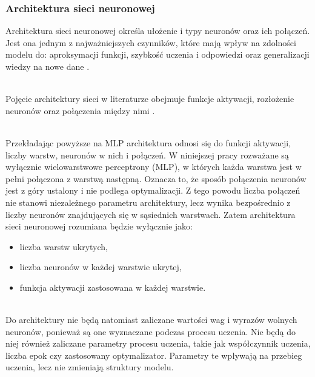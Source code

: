 \begin{center}
\end{center}

\subsubsection*{Architektura sieci neuronowej}
Architektura sieci neuronowej określa
ułożenie i typy neuronów oraz ich połączeń.
Jest ona jednym z najważniejszych czynników,
które mają wpływ na zdolności modelu do:
aproksymacji funkcji,
szybkość uczenia i odpowiedzi
oraz generalizacji wiedzy na nowe dane%
.

\noindent\\
Pojęcie architektury sieci w literaturze
obejmuje funkcje aktywacji, rozłożenie neuronów
oraz połączenia między nimi%
.

\noindent\\
Przekładając powyższe na MLP architektura
odnosi się do funkcji aktywacji, liczby warstw,
neuronów w nich i połączeń.
W niniejszej pracy rozważane są wyłącznie
wielowarstwowe perceptrony (MLP),
w których każda warstwa jest
w pełni połączona z warstwą następną.
Oznacza to, że sposób połączenia neuronów jest
z góry ustalony i nie podlega optymalizacji.
Z tego powodu liczba połączeń nie stanowi
niezależnego parametru architektury,
lecz wynika bezpośrednio z liczby neuronów
znajdujących się w sąsiednich warstwach.
Zatem architektura sieci neuronowej
rozumiana będzie wyłącznie jako:
\begin{itemize}
  \item liczba warstw ukrytych,
  \item liczba neuronów w każdej warstwie ukrytej,
  \item funkcja aktywacji zastosowana w każdej warstwie.
\end{itemize}

\noindent\\
Do architektury nie będą natomiast zaliczane
wartości wag i wyrazów wolnych neuronów,
ponieważ są one wyznaczane podczas procesu uczenia.
Nie będą do niej również zaliczane parametry procesu
uczenia, takie jak współczynnik uczenia,
liczba epok czy zastosowany optymalizator.
Parametry te wpływają na przebieg uczenia,
lecz nie zmieniają struktury modelu.

